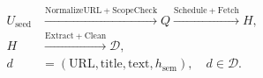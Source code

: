 \documentclass[border=4pt]{standalone}
\begin{document}
$\displaystyle
\begin{aligned}
U_{\mathrm{seed}}
&\xrightarrow{\mathrm{NormalizeURL+ScopeCheck}}Q
\xrightarrow{\mathrm{Schedule+Fetch}}H,\\
H&\xrightarrow{\mathrm{Extract+Clean}}\mathcal D,\\
d&=(\mathrm{URL},\mathrm{title},\mathrm{text},h_{\mathrm{sem}}),\quad d\in\mathcal D.
\end{aligned}
$
\end{document}
